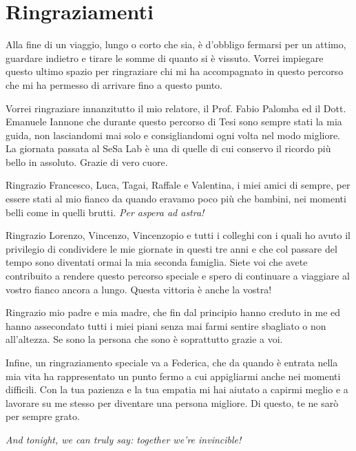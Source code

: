 \chapter{Ringraziamenti}

Alla fine di un viaggio, lungo o corto che sia, è d'obbligo fermarsi per un attimo, guardare indietro e tirare le somme di quanto si è vissuto. Vorrei impiegare questo ultimo spazio per ringraziare chi mi ha accompagnato in questo percorso che mi ha permesso di arrivare fino a questo punto. 

Vorrei ringraziare innanzitutto il mio relatore, il Prof. Fabio Palomba ed il Dott. Emanuele Iannone che durante questo percorso di Tesi sono sempre stati la mia guida, non lasciandomi mai solo e consigliandomi ogni volta nel modo migliore. La giornata passata al SeSa Lab è una di quelle di cui conservo il ricordo più bello in assoluto. Grazie di vero cuore.

Ringrazio Francesco, Luca, Tagai, Raffale e Valentina, i miei amici di sempre, per essere stati al mio fianco da quando eravamo poco più che bambini, nei momenti belli come in quelli brutti. \textit{Per aspera ad astra!}

Ringrazio Lorenzo, Vincenzo, Vincenzopio e tutti i colleghi con i quali ho avuto il privilegio di condividere le mie giornate in questi tre anni e che col passare del tempo sono diventati ormai la mia seconda famiglia. Siete voi che avete contribuito a rendere questo percorso speciale e spero di continuare a viaggiare al vostro fianco ancora a lungo. Questa vittoria è anche la vostra!

Ringrazio mio padre e mia madre, che fin dal principio hanno creduto in me ed hanno assecondato tutti i miei piani senza mai farmi sentire sbagliato o non all'altezza. Se sono la persona che sono è soprattutto grazie a voi.

Infine, un ringraziamento speciale va a Federica, che da quando è entrata nella mia vita ha rappresentato un punto fermo a cui appigliarmi anche nei momenti difficili. Con la tua pazienza e la tua empatia mi hai aiutato a capirmi meglio e a lavorare su me stesso per diventare una persona migliore. Di questo, te ne sarò per sempre grato.
\begin{flushright}
    \textit{And tonight, we can truly say: together we're invincible!}
\end{flushright}
